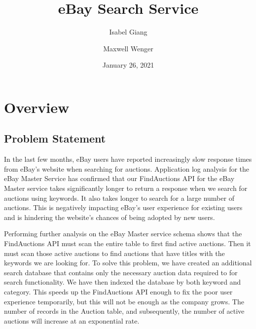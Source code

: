 \documentclass[12pt,a4paper]{article}
\title{eBay Search Service}
\author{Isabel Giang}
\author{Maxwell Wenger}
\affil{CSS490 Group Y4}
\date{January 26, 2021}
\begin{document}
\maketitle
\setcounter{tocdepth}{2}
\tableofcontents



\section{Overview}
\subsection{Problem Statement}
In the last few months, eBay users have reported increasingly slow response
times from eBay's website when searching for auctions. Application log analysis
for the eBay Master Service has confirmed that our FindAuctions API for the
eBay Master service takes significantly longer to return a response when we
search for auctions using keywords. It also takes longer to search for a large
number of auctions.
\vspace{\baselineskip}
This is negatively impacting eBay's user experience for existing users and is
hindering the website's chances of being adopted by new users.

\vspace{\baselineskip}

Performing further analysis on the eBay Master service schema shows that the
FindAuctions API must scan the entire table to first find active auctions. Then
it must scan those active auctions to find auctions that have titles with the
keywords we are looking for.
\vspace{\baselineskip}
To solve this problem, we have created an additional search database that
contains only the necessary auction data required to for search functionality.
We have then indexed the database by both keyword and category.
\vspace{\baselineskip}
This speeds up the FindAuctions API enough to fix the poor user experience
temporarily, but this will not be enough as the company grows. The number of
records in the Auction table, and subsequently, the number of active auctions
will increase at an exponential rate.
\end{document}
